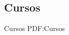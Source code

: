 \documentclass[letterpaper,MMMyyyy,nonstop]{simpleresumecv}
\begin{document}
\begin{body}

%
%


%
%


\section
{Cursos}
{Cursos}
{PDF:Cursos}




\end{body}
\end{document}
